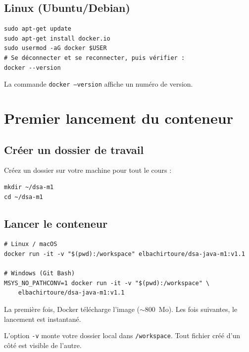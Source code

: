 \documentclass[11pt,a4paper]{article}
\begin{document}
\subsection{Linux (Ubuntu/Debian)}

\begin{lstlisting}[style=bash]
sudo apt-get update
sudo apt-get install docker.io
sudo usermod -aG docker $USER
# Se déconnecter et se reconnecter, puis vérifier :
docker --version
\end{lstlisting}

\begin{exercicebox}[Vérification 1]
La commande \texttt{docker --version} affiche un numéro de version.
\end{exercicebox}

\section{Premier lancement du conteneur}

\subsection{Créer un dossier de travail}

Créez un dossier sur votre machine pour tout le cours :

\begin{lstlisting}[style=bash]
mkdir ~/dsa-m1
cd ~/dsa-m1
\end{lstlisting}

\subsection{Lancer le conteneur}

\begin{lstlisting}[style=bash]
# Linux / macOS
docker run -it -v "$(pwd):/workspace" elbachirtoure/dsa-java-m1:v1.1

# Windows (Git Bash)
MSYS_NO_PATHCONV=1 docker run -it -v "$(pwd):/workspace" \
    elbachirtoure/dsa-java-m1:v1.1
\end{lstlisting}

La première fois, Docker télécharge l'image ($\sim$800~Mo). Les fois suivantes, le lancement est instantané.

L'option \texttt{-v} monte votre dossier local dans \texttt{/workspace}. Tout fichier créé d'un côté est visible de l'autre.
\end{document}
